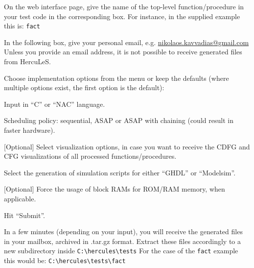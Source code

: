 \documentclass[a4paper]{article}
\begin{document}
\begin{list}{.}
{
\addtocounter{listcnt0}{3}
\setlength{\rightmargin}{\leftmargin}
}

\item On the web interface page, give the name of the top-level function/procedure
in your test code in the corresponding box. For instance, in the supplied
example this is:  \texttt{fact}

\item In the following box, give your personal email, e.g.
\href{mailto:nikolaos.kavvadias@gmail.com}{nikolaos.kavvadias@gmail.com}
Unless you provide an email address, it is not possible to receive generated
files from HercuLeS.

\item Choose implementation options from the menu or keep the defaults (where
multiple options exist, the first option is the default):
\setcounter{listcnt1}{0}
\begin{list}{.}
{
\setlength{\rightmargin}{\leftmargin}
}

\item Input in ``C'' or ``NAC'' language.

\item Scheduling policy: sequential, ASAP or ASAP with chaining (could result in
faster hardware).

\item {[}Optional{]} Select visualization options, in case you want to receive the CDFG
and CFG visualizations of all processed functions/procedures.

\item Select the generation of simulation scripts for either ``GHDL'' or ``Modelsim''.

\item {[}Optional{]} Force the usage of block RAMs for ROM/RAM memory, when applicable.
\end{list}

\item Hit ``Submit''.

\item In a few minutes (depending on your input), you will receive the generated
files in your mailbox, archived in .tar.gz format.
Extract these files accordingly to a new subdirectory inside
\texttt{C:\textbackslash{}hercules\textbackslash{}tests}
For the case of the \texttt{fact} example this would be: \texttt{C:\textbackslash{}hercules\textbackslash{}tests\textbackslash{}fact}


\end{list}
\end{document}
